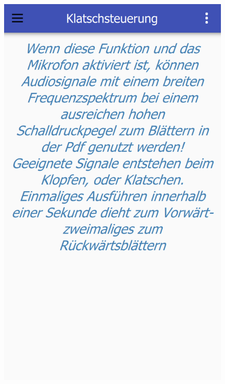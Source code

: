 \newpage


\begin{figure}[ht!]
	\centering
	\begin{minipage}{0.31\linewidth}
		\centering
		\includegraphics[scale=0.5]{GUI/Bilder/Klatschsteuerung.PNG}
	\end{minipage}
	\begin{minipage}{0.31\linewidth}

\end{minipage}
\end{figure}
